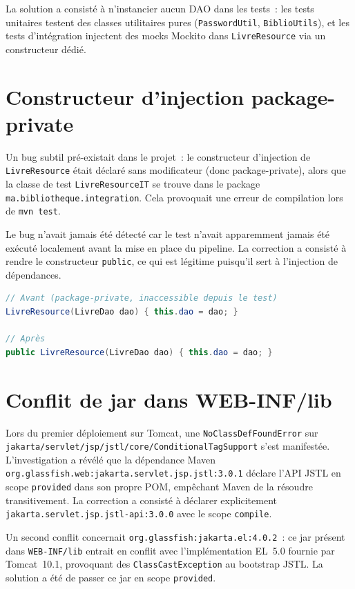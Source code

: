 \documentclass[12pt,a4paper]{report}
\begin{document}
La solution a consisté à n'instancier aucun DAO dans les tests~: les tests
unitaires testent des classes utilitaires pures (\texttt{PasswordUtil},
\texttt{BiblioUtils}), et les tests d'intégration injectent des mocks Mockito
dans \texttt{LivreResource} via un constructeur dédié.

\section{Constructeur d'injection package-private}

Un bug subtil pré-existait dans le projet~: le constructeur d'injection de
\texttt{LivreResource} était déclaré sans modificateur (donc package-private),
alors que la classe de test \texttt{LivreResourceIT} se trouve dans le package
\texttt{ma.bibliotheque.integration}. Cela provoquait une erreur de
compilation lors de \texttt{mvn test}.

Le bug n'avait jamais été détecté car le test n'avait apparemment jamais été
exécuté localement avant la mise en place du pipeline. La correction a
consisté à rendre le constructeur \texttt{public}, ce qui est légitime
puisqu'il sert à l'injection de dépendances.

\begin{lstlisting}[language=Java, caption={Correction du constructeur}]
// Avant (package-private, inaccessible depuis le test)
LivreResource(LivreDao dao) { this.dao = dao; }

// Après
public LivreResource(LivreDao dao) { this.dao = dao; }
\end{lstlisting}

\section{Conflit de jar dans WEB-INF/lib}

Lors du premier déploiement sur Tomcat, une \texttt{NoClassDefFoundError} sur
\texttt{jakarta/servlet/jsp/jstl/core/ConditionalTagSupport} s'est manifestée.
L'investigation a révélé que la dépendance Maven
\texttt{org.glassfish.web:jakarta.servlet.jsp.jstl:3.0.1} déclare l'API JSTL
en scope \texttt{provided} dans son propre POM, empêchant Maven de la résoudre
transitivement. La correction a consisté à déclarer explicitement
\texttt{jakarta.servlet.jsp.jstl-api:3.0.0} avec le scope \texttt{compile}.

Un second conflit concernait \texttt{org.glassfish:jakarta.el:4.0.2}~: ce jar
présent dans \texttt{WEB-INF/lib} entrait en conflit avec l'implémentation
EL~5.0 fournie par Tomcat~10.1, provoquant des \texttt{ClassCastException} au
bootstrap JSTL. La solution a été de passer ce jar en scope \texttt{provided}.
\end{document}

